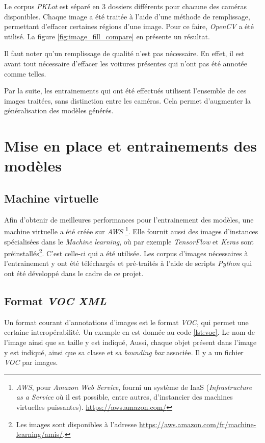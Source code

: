 Le corpus \textit{PKLot} est séparé en 3 dossiers différents pour chacune des caméras disponibles. Chaque image a été traitée à l'aide d'une méthode de remplissage, permettant d'effacer certaines régions d'une image\autocite{wiki:inpainting}. Pour ce faire, \textit{OpenCV} a été utilisé. La figure \ref{fig:image_fill_compare} en présente un résultat.

Il faut noter qu'un remplissage de qualité n'est pas nécessaire. En effet, il est avant tout nécessaire d'effacer les voitures présentes qui n'ont pas été annotée comme telles. 

Par la suite, les entrainements qui ont été effectués utilisent l'ensemble de ces images traitées, sans distinction entre les caméras. Cela permet d'augmenter la généralisation des modèles générés.

\section{Mise en place et entrainements des modèles}

\subsection{Machine virtuelle}
Afin d'obtenir de meilleures performances pour l'entrainement des modèles, une machine virtuelle a été créée sur \textit{AWS} \footnote{\textit{AWS}, pour \textit{Amazon Web Service}, fourni un système de IaaS (\textit{Infrastructure as a Service} où il est possible, entre autres, d'instancier des machines virtuelles puissantes). \url{https://aws.amazon.com/}}. Elle fournit aussi des images d'instances spécialisées dans le \textit{Machine learning}, où par exemple \textit{TensorFlow} et \textit{Keras} sont préinstallés\footnote{Les images sont disponibles à l'adresse \url{https://aws.amazon.com/fr/machine-learning/amis/}.}. C'est celle-ci qui a été utilisée. Les corpus d'images nécessaires à l'entrainement y ont été téléchargés et pré-traités à l'aide de scripts \textit{Python} qui ont été développé dans le cadre de ce projet.

\subsection{Format \textit{VOC} \textit{XML}}
Un format courant d'annotations d'images est le format \textit{VOC}, qui permet une certaine interopérabilité. Un exemple en est donnée au code \ref{lst:voc}. Le nom de l'image ainsi que sa taille y est indiqué, Aussi, chaque objet présent dans l'image y est indiqué, ainsi que sa classe et sa \textit{bounding box} associée. Il y a un fichier \textit{VOC} par images.

